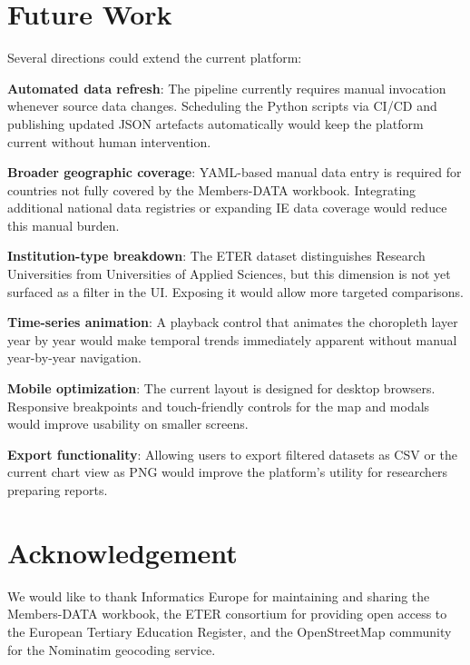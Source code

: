 \documentclass[final,3p,times,twocolumn]{elsarticle}
\begin{document}
\section{Future Work}
\label{sec:futurework}

Several directions could extend the current platform:

\textbf{Automated data refresh}: The pipeline currently requires manual invocation whenever source data changes. Scheduling the Python scripts via CI/CD and publishing updated JSON artefacts automatically would keep the platform current without human intervention.

\textbf{Broader geographic coverage}: YAML-based manual data entry is required for countries not fully covered by the Members-DATA workbook. Integrating additional national data registries or expanding IE data coverage would reduce this manual burden.

\textbf{Institution-type breakdown}: The ETER dataset distinguishes Research Universities from Universities of Applied Sciences, but this dimension is not yet surfaced as a filter in the UI. Exposing it would allow more targeted comparisons.

\textbf{Time-series animation}: A playback control that animates the choropleth layer year by year would make temporal trends immediately apparent without manual year-by-year navigation.

\textbf{Mobile optimization}: The current layout is designed for desktop browsers. Responsive breakpoints and touch-friendly controls for the map and modals would improve usability on smaller screens.

\textbf{Export functionality}: Allowing users to export filtered datasets as CSV or the current chart view as PNG would improve the platform's utility for researchers preparing reports.

\section*{Acknowledgement}

We would like to thank Informatics Europe for maintaining and sharing the Members-DATA workbook, the ETER consortium for providing open access to the European Tertiary Education Register, and the OpenStreetMap community for the Nominatim geocoding service.
\end{document}
